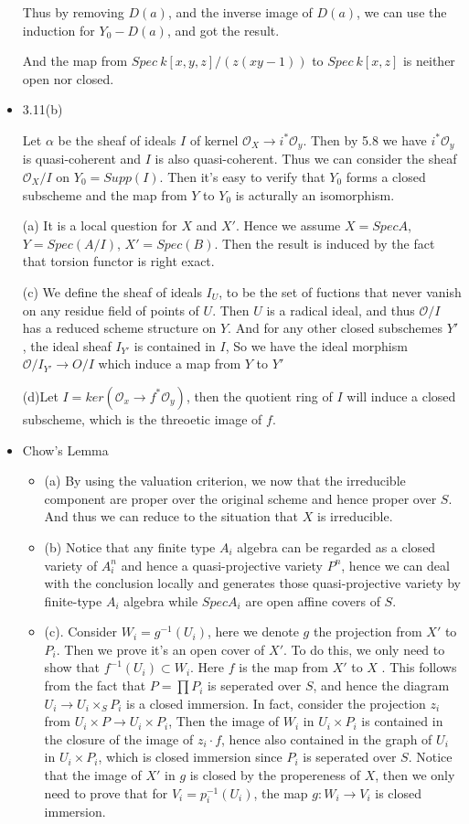 \documentclass[10pt,letterpaper]{article}
\renewcommand{\O}{\mathcal{O}}
\theoremstyle{plain}
\theoremstyle{definition}
\theoremstyle{remark}
\begin{document}
\begin{itemize}
Thus by removing $D(a)$, and the inverse image of $D(a)$, we can use the induction for $Y_{0}-D(a)$, and got the result.

And the map from $Spec\ k[x,y,z]/(z(xy-1))$ to $Spec\  k[x,z]$ is neither open nor closed.
\item 3.11(b)

Let $\alpha$ be the sheaf of ideals $I$ of kernel $\O_{X} \to i^{*}\O_{y}$. Then by 5.8 we have $i^{*}\O_{y}$ is quasi-coherent and $I$ is also quasi-coherent. Thus we can consider the sheaf $\O_{X}/I$ on $Y_{0}= Supp(I)$. Then it's easy to verify that $Y_{0}$ forms a  closed subscheme and the map from $Y$ to $Y_{0}$ is acturally an isomorphism.

(a) It is a local question for $X$ and $X'$. Hence we assume $X=Spec A$, $Y=Spec(A/I)$, $X'=Spec(B)$. Then the result is induced by the fact that torsion functor is right exact.

(c) We define the sheaf of ideals $I_{U}$, to be the set of fuctions that never vanish on any residue field of points of $U$. Then $U$ is a radical ideal, and thus $\O /I$ has a reduced scheme structure on $Y$. And for any other closed subschemes $Y'$, the ideal sheaf $I_{Y'}$ is contained in $I$, So we have the ideal morphism $\O/I_{Y'}\to O/I $ which induce a map from $Y$ to $Y'$

(d)Let $I=ker(\O_{x} \to f^{*}\O_{y})$, then the quotient ring of $I$ will induce a closed subscheme, which is the threoetic image of $f$.

\item Chow's Lemma
  \begin{itemize}
  \item (a) By using the valuation criterion, we now that the irreducible component are proper over the original scheme and hence proper over $S$. And thus we can reduce to the situation  that $X$ is irreducible.
\item(b) Notice that any finite type $A_{i}$ algebra can be regarded as a closed variety of $A_{i}^{n}$ and hence a quasi-projective variety $P^{n}$, hence we can deal with the conclusion locally and generates those quasi-projective variety by finite-type $A_{i}$ algebra while $SpecA_{i}$ are open affine covers of $S$.
\item (c). Consider $W_{i}=g^{-1}(U_{i})$, here we denote $g$ the projection from $X'$ to $P_{i}$. Then we prove it's an open cover of $X'$. To do this, we only need to show that $f^{-1}(U_{i})\subset W_{i}$. Here $f$ is the map from $X'$ to $X$ . This follows from the fact that $P=\prod P_{i}$ is seperated over $S$, and hence the diagram $U_{i}\to U_{i}\times_{S}P_ {i}$ is a closed immersion. In fact, consider the projection $z_{i}$ from $U_{i}\times P\to U_{i}\times P_{i}$, Then the image of $W_{i}$ in $U_{i}\times P_{i}$ is contained in the closure of the image of $z_{i}\cdot f$, hence also contained in the  graph of $U_{i}$ in $U_{i}\times P_{i}$, which is closed immersion since $P_{i}$ is seperated over $S$. Notice that the image of $X'$ in $g$ is closed by the propereness of $X$, then we only need to prove that for $V_{i}=p_{i}^{-1}(U_{i})$, the map $g: W_{i}\to V_{i}$ is closed immersion. 


\end{itemize}
\end{itemize}
\end{document}
